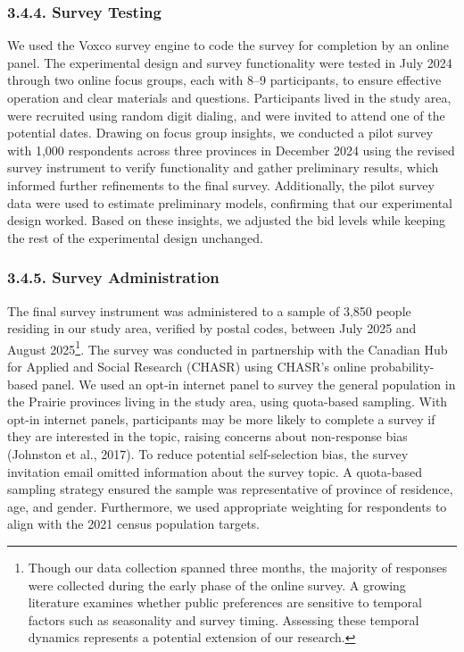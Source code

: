 \documentclass[12pt]{article}
\begin{document}
\subsubsection*{3.4.4. Survey Testing}

We used the Voxco survey engine to code the survey for completion by an online panel. The experimental design and survey functionality 
were tested in July 2024 through two online focus groups, each with 8–9 participants, to ensure effective operation and clear materials and 
questions. Participants lived in the study area, were recruited using random digit dialing, and were invited to attend one of the potential dates.
Drawing on focus group insights, we conducted a pilot survey with 1,000 respondents across three provinces in December 2024 using the revised 
survey instrument to verify functionality and gather preliminary results, which informed further refinements to the final survey. Additionally, 
the pilot survey data were used to estimate preliminary models, confirming that our experimental design worked. Based on these insights, 
we adjusted the bid levels while keeping the rest of the experimental design unchanged.

\subsubsection*{3.4.5. Survey Administration}

The final survey instrument was administered to a sample of 3,850 people residing in our study area, verified by postal codes, between July 
2025 and August 2025\footnote{Though our data collection spanned three months, the majority of responses were collected during the early 
phase of the online survey. A growing literature examines whether public preferences are sensitive to temporal factors such as seasonality 
and survey timing. Assessing these temporal dynamics represents a potential extension of our research.}. %
The survey was conducted in partnership with the Canadian Hub for Applied and Social Research (CHASR) using CHASR’s online probability-based 
panel. We used an opt-in internet panel to survey the general population in the Prairie provinces living in the study area, using quota-based 
sampling. With opt-in internet panels, participants may be more likely to complete a survey if they are interested in the topic, raising 
concerns about non-response bias (Johnston et al., 2017). To reduce potential self-selection bias, the survey invitation email omitted information 
about the survey topic. A quota-based sampling strategy ensured the sample was representative of province of residence, age, and gender. 
Furthermore, we used appropriate weighting for respondents to align with the 2021 census population targets. %
\end{document}
